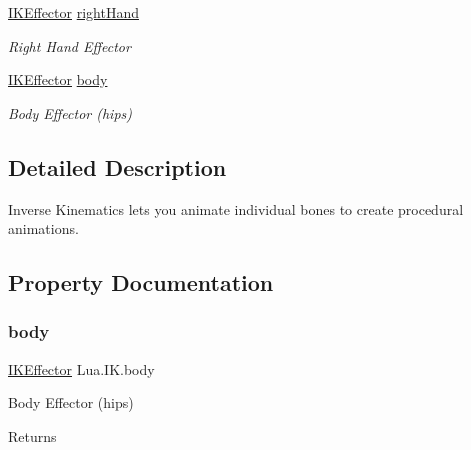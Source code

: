 \begin{DoxyCompactItemize}
\mbox{\hyperlink{class_lua_1_1_i_k_effector}{I\+K\+Effector}} \mbox{\hyperlink{class_lua_1_1_i_k_a1321851e538f60beb7fa5d655e18ab75}{right\+Hand}}
\begin{DoxyCompactList}\small\item\em Right Hand Effector \end{DoxyCompactList}\item 
\mbox{\hyperlink{class_lua_1_1_i_k_effector}{I\+K\+Effector}} \mbox{\hyperlink{class_lua_1_1_i_k_aca9dea4db5e6c66d5d1e904266c626ef}{body}}
\begin{DoxyCompactList}\small\item\em Body Effector (hips) \end{DoxyCompactList}\end{DoxyCompactItemize}


\subsection{Detailed Description}
Inverse Kinematics lets you animate individual bones to create procedural animations. 



\subsection{Property Documentation}
\mbox{\label{class_lua_1_1_i_k_aca9dea4db5e6c66d5d1e904266c626ef}} 
\subsubsection{\texorpdfstring{body}{body}}
{\footnotesize\ttfamily \mbox{\hyperlink{class_lua_1_1_i_k_effector}{I\+K\+Effector}} Lua.\+I\+K.\+body\hspace{0.3cm}{\ttfamily [get]}}



Body Effector (hips) 

\begin{DoxyReturn}{Returns}

\end{DoxyReturn}
\mbox{\label{class_lua_1_1_i_k_a9cbf5715c753f97860bf9d268e76abcc}} 
